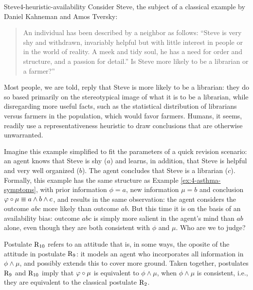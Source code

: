 \begin{xmpl}{Steve}{4-heuristic-availability}
	Consider Steve, the subject of a classical example by Daniel Kahneman
	and Amos Tversky:

	\begin{quote}
		An individual has been described by a neighbor as follows: 
		``Steve is very shy and withdrawn, 
		invariably helpful but with little 
		interest in people or in the world of reality. 
		A meek and tidy soul, 
		he has a need for order and structure, 
		and a passion for detail.” 
		Is Steve more likely to be a librarian or a farmer?''
		\cite{Kahneman11}
	\end{quote}
	Most people, we are told, reply that Steve is more likely to be a librarian: 
	they do so based primarily on the stereotypical 
	image of what it is to be a librarian,
	while disregarding more useful facts, such as the statistical distribution of
	librarians versus farmers in the population, which would favor farmers.
	Humans, it seems, readily use a representativeness heuristic to draw 
	conclusions that are otherwise unwarranted.

	Imagine this example simplified to fit the parameters of a quick 
	revision scenario:
	an agent knows that Steve is shy ($a$)
	and learns, in addition, that Steve is helpful and very well organized ($b$).
	The agent concludes that Steve is a librarian ($c$).
	Formally, this example has the same structure as 
	Example \ref{ex:4-asthma-symptoms},
	with prior information $\phi=a$, 
	new information $\mu=b$
	and conclusion $\varphi\circ\mu\equiv a\land b\land c$,
	and results in the same observation:
	the agent considers the outcome $abc$ more likely than outcome $ab$.
	But this time it is on the basis of an availability bias:
	outcome $abc$ is simply more salient in the agent's mind
	than $ab$ alone, even though they are both consistent with $\phi$ and $\mu$.
	Who are we to judge?
\end{xmpl}

Postulate $\mathrm{R}_{10}$ refers to an attitude that is, in some ways, 
the oposite of the attitude in postulate $\mathrm{R}_{9}$: it models an agent who 
incorporates all information in $\phi\land\mu$, 
and possibly extends this to cover more ground.
Taken together, postulates $\mathrm{R}_{9}$ and $\mathrm{R}_{10}$ 
imply that $\varphi\circ\mu$ is equivalent to $\phi\land\mu$, when $\phi\land\mu$ is consistent,
i.e., they are equivalent to the classical postulate $\mathrm{R}_{2}$.


